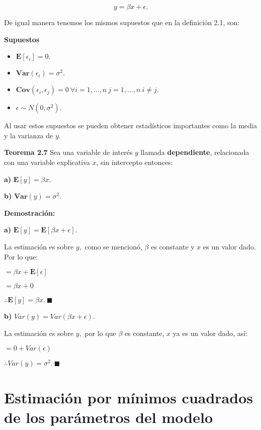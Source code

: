 \documentclass[
  a4paper,
  oneside,
  openany]{book}
\begin{document}
\[y=\beta x + \epsilon.\]

De igual manera tenemos los mismos supuestos que en la definición 2.1, son:

\textbf{Supuestos}

\begin{itemize}
\item
  \(\mathbf{E}[\epsilon_{i}]=0.\)
\item
  \(\textbf{Var}(\epsilon_{i})=\sigma^2.\)
\item
  \(\textbf{Cov}(\epsilon_{i},\epsilon_{j})= 0 \ \forall i = 1, \ldots, n \ j=1, \ldots, n \ i \neq j.\)
\item
  \(\epsilon \sim N(0,\sigma^2).\)
\end{itemize}

Al usar estos supuestos se pueden obtener estadísticos importantes como la
media y la varianza de \(y\).

\textbf{Teorema 2.7} Sea una variable de interés \(y\) llamada \textbf{dependiente}, relacionada con una variable explicativa \(x\), sin intercepto entonces:

\textbf{a)} \(\mathbf{E}[y]=\beta x.\)

\textbf{b)} \(\textbf{Var}(y)=\sigma^2.\)

\textbf{Demostración:}

\textbf{a)} \(\mathbf{E}[y]=\mathbf{E}[\beta x + \epsilon].\)

La estimación es sobre \(y,\) como se mencionó, \(\beta\) es constante y \(x\) es un valor dado. Por lo que:

\(=\beta x + \mathbf{E}[\epsilon]\)

\(=\beta x + 0\)

\(\therefore \mathbf{E}[y]= \beta x. \ \blacksquare\)

\textbf{b)} \(Var(y)=Var(\beta x + \epsilon).\)

La estimación es sobre \(y,\) por lo que \(\beta\) es constante, \(x\) ya es un valor dado, así:

\(=0+Var(\epsilon)\)

\(\therefore Var(y)=\sigma^2.\ \blacksquare\)

\hypertarget{estimaciuxf3n-por-muxednimos-cuadrados-de-los-paruxe1metros-del-modelo-1}{%
\section{Estimación por mínimos cuadrados de los parámetros del modelo}\label{estimaciuxf3n-por-muxednimos-cuadrados-de-los-paruxe1metros-del-modelo-1}}
\end{document}
